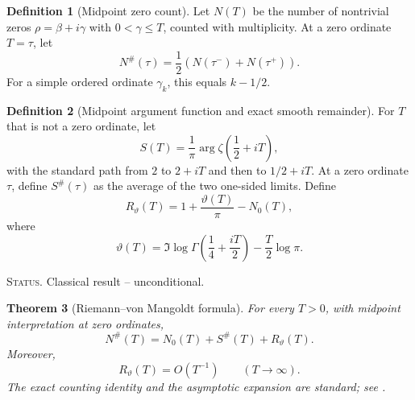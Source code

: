 \documentclass[11pt]{amsart}
\numberwithin{equation}{section}
\theoremstyle{plain}
\newtheorem{theorem}{Theorem}[section]
\theoremstyle{definition}
\newtheorem{definition}[theorem]{Definition}
\theoremstyle{remark}
\newcommand{\1}{\mathbf{1}}
\newcommand{\statusnote}[1]{%
  \par\smallskip\noindent
  \begingroup\footnotesize\textsc{Status.} #1\endgroup
  \par\smallskip}
\begin{document}
\begin{definition}[Midpoint zero count]
\label{def:midpoint_zero_count}
Let \(N(T)\) be the number of nontrivial zeros \(\rho=\beta+i\gamma\)
with \(0<\gamma\leq T\), counted with multiplicity.  At a zero ordinate
\(T=\tau\), let
\begin{equation}
N^{\#}(\tau)
=
\frac12\left(N(\tau^-)+N(\tau^+)\right).
\label{eq:midpoint_zero_count}
\end{equation}
For a simple ordered ordinate \(\gamma_k\), this equals \(k-1/2\).
\end{definition}

\begin{definition}[Midpoint argument function and exact smooth remainder]
\label{def:rvm_midpoint_argument_remainder}
For \(T\) that is not a zero ordinate, let
\begin{equation}
S(T)
=
\frac1\pi\arg\zeta\!\left(\frac12+iT\right),
\label{eq:rvm_S_function}
\end{equation}
with the standard path from \(2\) to \(2+iT\) and then to
\(1/2+iT\).  At a zero ordinate \(\tau\), define \(S^{\#}(\tau)\) as the
average of the two one-sided limits.  Define
\begin{equation}
R_\vartheta(T)
=
1+\frac{\vartheta(T)}{\pi}-N_0(T),
\label{eq:rvm_exact_smooth_remainder}
\end{equation}
where
\begin{equation}
\vartheta(T)
=
\Im\log\Gamma\!\left(\frac14+\frac{iT}{2}\right)
-
\frac T2\log\pi.
\label{eq:riemann_siegel_theta}
\end{equation}
\end{definition}

\statusnote{Classical result -- unconditional.}
\begin{theorem}[Riemann--von Mangoldt formula]
\label{thm:rvm_formula}
For every \(T>0\), with midpoint interpretation at zero ordinates,
\begin{equation}
\boxed{
N^{\#}(T)
=
N_0(T)+S^{\#}(T)+R_\vartheta(T).
}
\label{eq:rvm_formula}
\end{equation}
Moreover,
\begin{equation}
R_\vartheta(T)=O(T^{-1})
\qquad(T\to\infty).
\label{eq:rvm_remainder}
\end{equation}
The exact counting identity and the asymptotic expansion are standard; see
\cite[Chapter~9]{Titchmarsh1986}.
\end{theorem}
\end{document}
